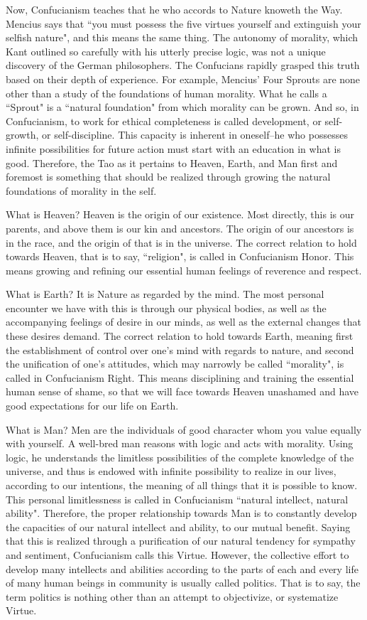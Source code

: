 Now, Confucianism teaches that he who accords to Nature knoweth the Way. Mencius says that ``you must possess the five virtues yourself and extinguish your selfish nature", and this means the same thing. The autonomy of morality, which Kant outlined so carefully with his utterly precise logic, was not a unique discovery of the German philosophers. The Confucians rapidly grasped this truth based on their depth of experience. For example, Mencius' Four Sprouts are none other than a study of the foundations of human morality. What he calls a ``Sprout" is a ``natural foundation" from which morality can be grown. And so, in Confucianism, to work for ethical completeness is called development, or self-growth, or self-discipline. This capacity is inherent in oneself–he who possesses infinite possibilities for future action must start with an education in what is good. Therefore, the Tao as it pertains to Heaven, Earth, and Man first and foremost is something that should be realized through growing the natural foundations of morality in the self.

What is Heaven? Heaven is the origin of our existence. Most directly, this is our parents, and above them is our kin and ancestors. The origin of our ancestors is in the race, and the origin of that is in the universe. The correct relation to hold towards Heaven, that is to say, ``religion", is called in Confucianism Honor. This means growing and refining our essential human feelings of reverence and respect.

What is Earth? It is Nature as regarded by the mind. The most personal encounter we have with this is through our physical bodies, as well as the accompanying feelings of desire in our minds, as well as the external changes that these desires demand. The correct relation to hold towards Earth, meaning first the establishment of control over one's mind with regards to nature, and second the unification of one's attitudes, which may narrowly be called ``morality", is called in Confucianism Right. This means disciplining and training the essential human sense of shame, so that we will face towards Heaven unashamed and have good expectations for our life on Earth.

What is Man? Men are the individuals of good character whom you value equally with yourself. A well-bred man reasons with logic and acts with morality. Using logic, he understands the limitless possibilities of the complete knowledge of the universe, and thus is endowed with infinite possibility to realize in our lives, according to our intentions, the meaning of all things that it is possible to know. This personal limitlessness is called in Confucianism ``natural intellect, natural ability". Therefore, the proper relationship towards Man is to constantly develop the capacities of our natural intellect and ability, to our mutual benefit. Saying that this is realized through a purification of our natural tendency for sympathy and sentiment, Confucianism calls this Virtue. However, the collective effort to develop many intellects and abilities according to the parts of each and every life of many human beings in community is usually called politics. That is to say, the term politics is nothing other than an attempt to objectivize, or systematize Virtue.

